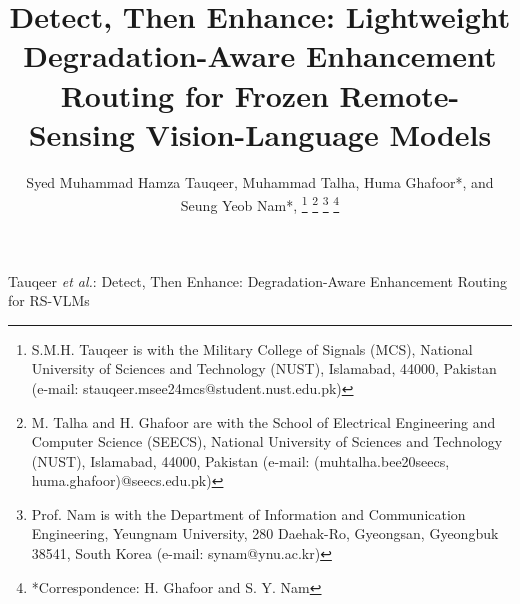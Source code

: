 \documentclass[lettersize,journal]{IEEEtran}
\begin{document}
\title{Detect, Then Enhance: Lightweight Degradation-Aware Enhancement Routing for Frozen Remote-Sensing Vision-Language Models}

\author{Syed Muhammad Hamza Tauqeer, Muhammad Talha, Huma Ghafoor*, and Seung Yeob Nam*,
\thanks{S.M.H. Tauqeer is with the Military College of Signals (MCS), National University of Sciences and Technology (NUST), Islamabad, 44000, Pakistan (e-mail: stauqeer.msee24mcs@student.nust.edu.pk)}
\thanks{M. Talha and H. Ghafoor are with the School of Electrical Engineering and Computer Science (SEECS), National University of Sciences and Technology (NUST), Islamabad, 44000, Pakistan (e-mail: (muhtalha.bee20seecs, huma.ghafoor)@seecs.edu.pk)}
\thanks{Prof. Nam is with the Department of Information and Communication Engineering, Yeungnam University,
280 Daehak-Ro, Gyeongsan, Gyeongbuk 38541, South Korea (e-mail: synam@ynu.ac.kr)}
\thanks{*Correspondence: H. Ghafoor and S. Y. Nam}}

%
{Tauqeer \MakeLowercase{\textit{et al.}}: Detect, Then Enhance: Degradation-Aware Enhancement Routing for RS-VLMs}
\maketitle
\end{document}
